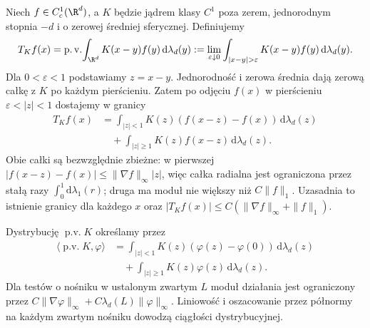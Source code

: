 \begin{definicja}
Niech $f\in C_c^1(\R^d)$, a $K$ będzie jądrem klasy $C^1$ poza
zerem, jednorodnym stopnia $-d$ i o zerowej średniej sferycznej.
Definiujemy
\[
 T_Kf(x)=\operatorname{p.v.}\!\int_{\R^d}K(x-y)f(y)\,\mathrm d\lambda_d(y)
 :=\lim_{\varepsilon\downarrow0}
 \int_{|x-y|>\varepsilon}K(x-y)f(y)\,\mathrm d\lambda_d(y).
\]
Dla $0<\varepsilon<1$ podstawiamy $z=x-y$.
Jednorodność i zerowa średnia dają zerową całkę z $K$
po każdym pierścieniu. Zatem po odjęciu $f(x)$
w pierścieniu $\varepsilon<|z|<1$ dostajemy w granicy
\[
 \begin{aligned}
 T_Kf(x)&=\int_{|z|<1}K(z)(f(x-z)-f(x))\,\mathrm d\lambda_d(z)\\
 &\quad+\int_{|z|\ge1}K(z)f(x-z)\,\mathrm d\lambda_d(z).
 \end{aligned}
\]
Obie całki są bezwzględnie zbieżne: w pierwszej
$|f(x-z)-f(x)|\le\|\nabla f\|_\infty |z|$,
więc całka radialna jest ograniczona przez stałą razy
$\int_0^1\mathrm d\lambda_1(r)$; druga ma moduł
nie większy niż $C\|f\|_1$. Uzasadnia to istnienie
granicy dla każdego $x$ oraz
$|T_Kf(x)|\le C(\|\nabla f\|_\infty+\|f\|_1)$.
\end{definicja}

Dystrybucję $\operatorname{p.v.}K$ określamy przez
\[
 \begin{aligned}
 \langle\operatorname{p.v.}K,\varphi\rangle
 &=\int_{|z|<1}K(z)(\varphi(z)-\varphi(0))\,\mathrm d\lambda_d(z)\\
 &\quad+\int_{|z|\ge1}K(z)\varphi(z)\,\mathrm d\lambda_d(z).
 \end{aligned}
\]
Dla testów o nośniku w ustalonym zwartym $L$ moduł
działania jest ograniczony przez
$C\|\nabla\varphi\|_\infty+C\lambda_d(L)\|\varphi\|_\infty$.
Liniowość i oszacowanie przez półnormy na każdym zwartym
nośniku dowodzą ciągłości dystrybucyjnej.

